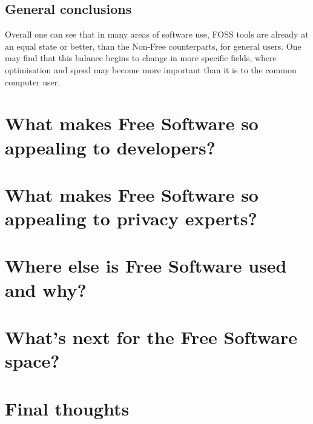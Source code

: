 \documentclass[a4paper,12pt]{article}
\begin{document}
{\subsection{General conclusions} Overall one can see that in many areas of software use, FOSS tools are already
at an equal state or better, than the Non-Free counterparts, for general users. One may find that this balance
begins to change in more specific fields, where optimisation and speed may become more important than it is to
the common computer user.

\section{What makes Free Software so appealing to developers?} \section{What makes Free Software so appealing to
privacy experts?} \section{Where else is Free Software used and why?} \section{What's next for the Free Software
space?} \section{Final thoughts}

\newpage \printbibliography } 
\end{document}
